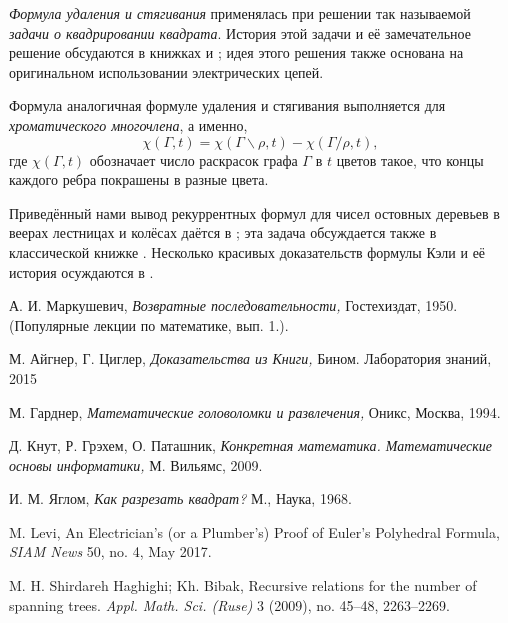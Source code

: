 \documentclass{article}
\begin{document}
\emph{Формула удаления и стягивания} применялась при решении так называемой \emph{задачи о квадрировании квадрата}.
История этой задачи и её замечательное решение обсудаются в книжках \cite{yaglom} и \cite[Глава 32]{gardner};
идея этого решения также основана на оригинальном использовании электрических цепей.

Формула аналогичная формуле удаления и стягивания выполняется для \emph{хроматического многочлена}, а именно,
\[\chi(\Gamma,t)=\chi(\Gamma\backslash\rho,t)-\chi(\Gamma/\rho,t),\] 
где $\chi(\Gamma,t)$ обозначает число раскрасок графа $\Gamma$ в $t$ цветов такое, что концы каждого ребра покрашены в разные цвета.

Приведённый нами вывод рекуррентных формул для чисел ос\-тов\-ных деревьев в веерах лестницах и колёсах даётся в \cite{haghighi-bibak};
эта задача обсуждается также в классической книжке \cite{knut}.
Несколько красивых доказательств формулы Кэли и её история осуждаются в \cite[Глава 30]{aigner-ziegler}.

\begin{thebibliography}{52}
А. И. Маркушевич,
\emph{Возвратные последовательности,} 
Гостехиздат, 1950. (Популярные лекции по математике, вып. 1.).

 М. Айгнер, Г. Циглер, 
\emph{Доказательства из Книги,} 
Бином. Лаборатория знаний, 2015 

 М. Гарднер, \emph{Математические головоломки и развлечения,}  Оникс, Москва, 1994.

Д. Кнут, Р. Грэхем, О. Паташник,
\emph{Конкретная математика. Математические основы информатики,}
М. Вильямс, 
2009.

И. М. Яглом,
\emph{Как разрезать квадрат?}
М., Наука, 1968.

 M. Levi,
An Electrician’s (or a Plumber’s)
Proof of Euler’s Polyhedral Formula,
\emph{SIAM News} 50, no. 4, May 2017.


 M. H. Shirdareh Haghighi; Kh. Bibak, 
Recursive relations for the number of spanning trees. 
\emph{Appl. Math. Sci. (Ruse)} 3 (2009), no. 45--48, 2263--2269. 
\end{thebibliography}
\end{document}
